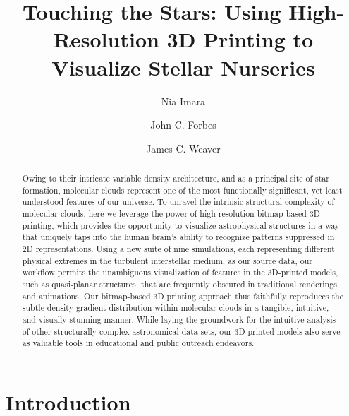 \documentclass[twocolumn]{aastex63}
\begin{document}
\title{Touching the Stars: Using High-Resolution 3D Printing to  Visualize Stellar Nurseries}   


\author{Nia Imara}

\author{John C. Forbes}

\author{James C. Weaver}




\begin{abstract}
Owing to their intricate variable density architecture, and as a principal site of star formation, molecular clouds represent one of the most functionally significant, yet least understood features of our universe.  To unravel the intrinsic structural complexity of molecular clouds, here we leverage the power of high-resolution bitmap-based 3D printing, which provides the opportunity to visualize astrophysical structures in a way that uniquely taps into the human brain’s ability to recognize patterns suppressed in 2D representations.  Using a new suite of nine simulations, each representing different physical extremes in the turbulent interstellar medium, as our source data, our workflow permits the unambiguous visualization of features in the 3D-printed models, such as quasi-planar structures, that are frequently obscured in traditional renderings and animations.  Our bitmap-based 3D printing approach thus faithfully reproduces the subtle density gradient distribution within molecular clouds in a tangible, intuitive, and visually stunning manner.  While laying the groundwork for the intuitive analysis of other structurally complex astronomical data sets, our 3D-printed models also serve as valuable tools in educational and public outreach endeavors. 
\\
\end{abstract}


\section{Introduction}
\end{document}
